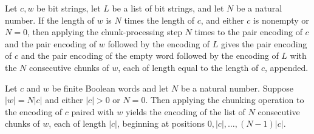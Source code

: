 \begin{theorem}
\label{Complexity.BinArith.iterate_chunkStep}
\leanok
{}
Let $c,w$ be bit strings, let $L$ be a list of bit strings, and let $N$ be a natural
number. If the length of $w$ is $N$ times the length of $c$, and either $c$ is nonempty
or $N=0$, then applying the chunk-processing step $N$ times to the pair encoding of $c$
and the pair encoding of $w$ followed by the encoding of $L$ gives the pair encoding of
$c$ and the pair encoding of the empty word followed by the encoding of $L$ with the $N$
consecutive chunks of $w$, each of length equal to the length of $c$, appended.
\end{theorem}

\begin{theorem}
\label{Complexity.BinArith.chunkW_pairEncode}
\leanok
{}
Let $c$ and $w$ be finite Boolean words and let $N$ be a natural number. Suppose
$|w|=N|c|$ and either $|c|>0$ or $N=0$. Then applying the chunking operation to the
encoding of $c$ paired with $w$ yields the encoding of the list of $N$ consecutive
chunks of $w$, each of length $|c|$, beginning at positions $0,|c|,\ldots,(N-1)|c|$.
\end{theorem}

